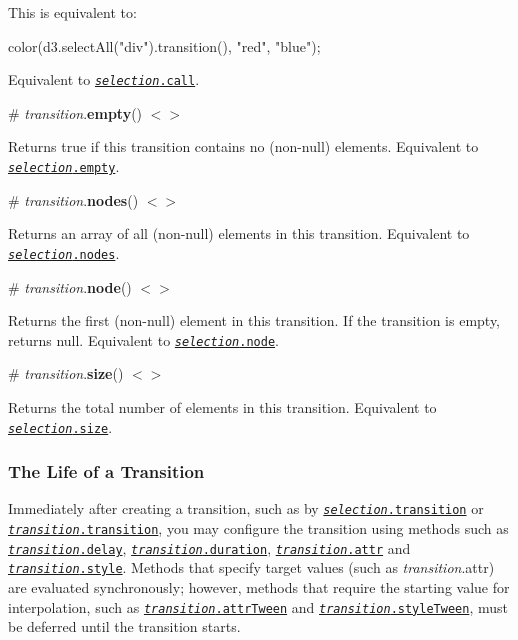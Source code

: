 This is equivalent to\+:


\begin{DoxyCode}
color(d3.selectAll("div").transition(), "red", "blue");
\end{DoxyCode}


Equivalent to \href{https://github.com/d3/d3-selection#selection_call}{\tt {\itshape selection}.call}.

\label{_transition_empty}%
\# {\itshape transition}.{\bfseries empty}() \href{https://github.com/d3/d3-selection/blob/master/src/selection/empty.js}{\tt $<$$>$}

Returns true if this transition contains no (non-\/null) elements. Equivalent to \href{https://github.com/d3/d3-selection#selection_empty}{\tt {\itshape selection}.empty}.

\label{_transition_nodes}%
\# {\itshape transition}.{\bfseries nodes}() \href{https://github.com/d3/d3-selection/blob/master/src/selection/nodes.js}{\tt $<$$>$}

Returns an array of all (non-\/null) elements in this transition. Equivalent to \href{https://github.com/d3/d3-selection#selection_nodes}{\tt {\itshape selection}.nodes}.

\label{_transition_node}%
\# {\itshape transition}.{\bfseries node}() \href{https://github.com/d3/d3-selection/blob/master/src/selection/node.js}{\tt $<$$>$}

Returns the first (non-\/null) element in this transition. If the transition is empty, returns null. Equivalent to \href{https://github.com/d3/d3-selection#selection_node}{\tt {\itshape selection}.node}.

\label{_transition_size}%
\# {\itshape transition}.{\bfseries size}() \href{https://github.com/d3/d3-selection/blob/master/src/selection/size.js}{\tt $<$$>$}

Returns the total number of elements in this transition. Equivalent to \href{https://github.com/d3/d3-selection#selection_size}{\tt {\itshape selection}.size}.

\subsubsection*{The Life of a Transition}

Immediately after creating a transition, such as by \href{#selection_transition}{\tt {\itshape selection}.transition} or \href{#transition_transition}{\tt {\itshape transition}.transition}, you may configure the transition using methods such as \href{#transition_delay}{\tt {\itshape transition}.delay}, \href{#transition_duration}{\tt {\itshape transition}.duration}, \href{#transition_attr}{\tt {\itshape transition}.attr} and \href{#transition_style}{\tt {\itshape transition}.style}. Methods that specify target values (such as {\itshape transition}.attr) are evaluated synchronously; however, methods that require the starting value for interpolation, such as \href{#transition_attrTween}{\tt {\itshape transition}.attr\+Tween} and \href{#transition_styleTween}{\tt {\itshape transition}.style\+Tween}, must be deferred until the transition starts.

